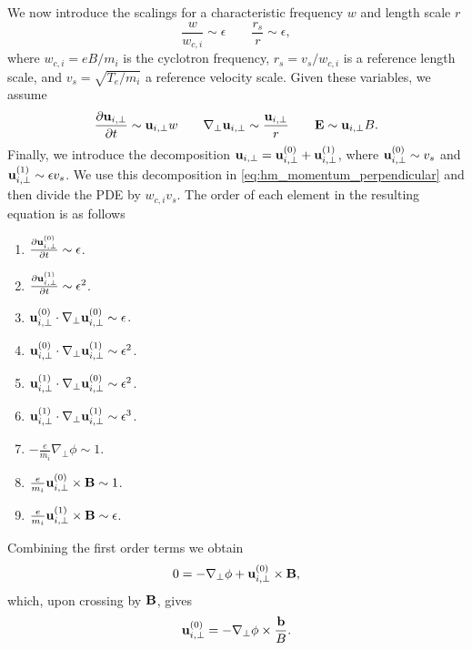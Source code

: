 \documentclass[11pt]{article}
\begin{document}
We now introduce the scalings for a characteristic frequency $w$ and length scale $r$
\begin{equation}
    \frac{w}{w_{c,i}} \sim \epsilon \qquad \frac{r_s}{r} \sim \epsilon,
\end{equation}
where $w_{c,i} = eB/m_i$ is the cyclotron frequency, $r_s = v_s/w_{c,i}$ is a reference length scale, and $v_s = \sqrt{T_e/m_i}$ a reference velocity scale. Given these variables, we assume
\begin{equation}
    \frac{\partial \mathbf{u}_{i,\perp}}{\partial t} \sim \mathbf{u}_{i,\perp} w \qquad \nabla_\perp \mathbf{u}_{i,\perp} \sim \frac{\mathbf{u}_{i,\perp}}{r} \qquad \mathbf{E} \sim \mathbf{u}_{i,\perp} B.
\end{equation}
Finally, we introduce the decomposition $\mathbf{u}_{i,\perp} = \mathbf{u}_{i,\perp}^{(0)} + \mathbf{u}_{i,\perp}^{(1)}$, where $\mathbf{u}_{i,\perp}^{(0)} \sim v_s$ and $\mathbf{u}_{i,\perp}^{(1)} \sim \epsilon v_s$. We use this decomposition in \cref{eq:hm_momentum_perpendicular} and then divide the PDE by $w_{c,i} v_s$. The order of each element in the resulting equation is as follows
\begin{enumerate}
    \item $\frac{\partial \mathbf{u}_{i,\perp}^{(0)}}{\partial t} \sim \epsilon$.
    \item $\frac{\partial \mathbf{u}_{i,\perp}^{(1)}}{\partial t} \sim \epsilon^2$.
    \item $\mathbf{u}_{i,\perp}^{(0)} \cdot \nabla_\perp \mathbf{u}_{i,\perp}^{(0)} \sim \epsilon$.
    \item $\mathbf{u}_{i,\perp}^{(0)} \cdot \nabla_\perp \mathbf{u}_{i,\perp}^{(1)} \sim \epsilon^2$.
    \item $\mathbf{u}_{i,\perp}^{(1)} \cdot \nabla_\perp \mathbf{u}_{i,\perp}^{(0)} \sim \epsilon^2$.
    \item $\mathbf{u}_{i,\perp}^{(1)} \cdot \nabla_\perp \mathbf{u}_{i,\perp}^{(1)} \sim \epsilon^3$.
    \item $-\frac{e}{m_i} \nabla_\perp \phi \sim 1$.
    \item $\frac{e}{m_i} \mathbf{u}_{i,\perp}^{(0)} \times \mathbf{B} \sim 1$.
    \item $\frac{e}{m_i} \mathbf{u}_{i,\perp}^{(1)} \times \mathbf{B} \sim \epsilon$.
\end{enumerate}
Combining the first order terms we obtain
\begin{equation}
    0 = - \nabla_\perp \phi + \mathbf{u}_{i,\perp}^{(0)} \times \mathbf{B},
\end{equation}
which, upon crossing by $\mathbf{B}$, gives
\begin{equation}
\label{eq:hm_e_cross_b_drift}
    \mathbf{u}_{i,\perp}^{(0)} = -\nabla_\perp \phi \times \frac{\mathbf{b}}{B}.
\end{equation}
\end{document}
